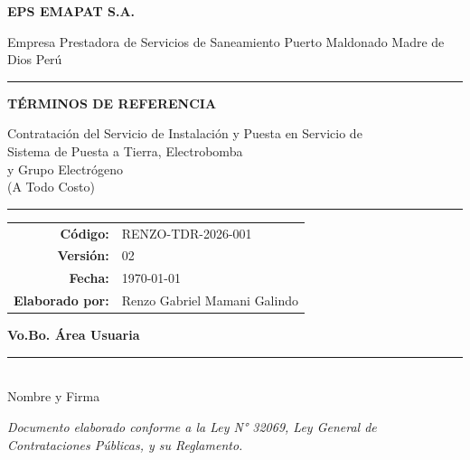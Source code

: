 \documentclass[12pt,a4paper]{article}
\begin{document}
\begin{titlepage}
\begin{center}
\vspace*{2cm}

{\large\textbf{EPS EMAPAT S.A.}}

\vspace{0.3cm}
{\small Empresa Prestadora de Servicios de Saneamiento}
{\small \textbullet{} Puerto Maldonado \textbullet{} Madre de Dios \textbullet{} Perú}

\vspace{2cm}

\rule{\textwidth}{1.5pt}
\vspace{0.5cm}
{\LARGE\bfseries\color{navyblue} TÉRMINOS DE REFERENCIA}
\vspace{0.3cm}

{\Large Contratación del Servicio de Instalación y Puesta en Servicio de\\
Sistema de Puesta a Tierra, Electrobomba\\
y Grupo Electrógeno \\ (A Todo Costo)}

\vspace{0.3cm}
\rule{\textwidth}{1.5pt}

\vspace{1.5cm}

\begin{tabular}{rl}
\textbf{Código:} & RENZO-TDR-2026-001 \\
\textbf{Versión:} & 02 \\
\textbf{Fecha:} & \today \\
\textbf{Elaborado por:} & Renzo Gabriel Mamani Galindo \\
\end{tabular}

\vspace{3cm}

\begin{flushleft}
\small
\textbf{Vo.Bo. Área Usuaria} \\[0.8cm]
\rule{5cm}{0.4pt} \\
Nombre y Firma
\end{flushleft}

\vfill
{\footnotesize \textit{Documento elaborado conforme a la Ley N° 32069, Ley General de Contrataciones Públicas,
y su Reglamento.}}
\end{center}
\end{titlepage}
\end{document}
